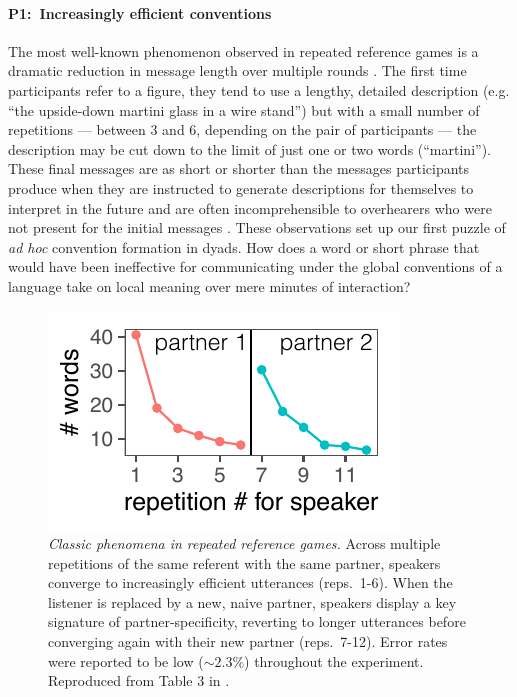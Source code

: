 \paragraph{P1:~Increasingly efficient conventions}
The most well-known phenomenon observed in repeated reference games is a dramatic reduction in message length over multiple rounds \cite{krauss_changes_1964, ClarkWilkesGibbs86_ReferringCollaborative, hawkins2020characterizing}. 
The first time participants refer to a figure, they tend to use a lengthy, detailed description (e.g. ``the upside-down martini glass in a wire stand'') but with a small number of repetitions --- between 3 and 6, depending on the pair of participants --- the description may be cut down to the limit of just one or two words (``martini''). 
These final messages are as short or shorter than the messages participants produce when they are instructed to generate descriptions for themselves to interpret in the future \cite{FussellKrauss89_IntendedAudienceCommonGround} and are often incomprehensible to overhearers who were not present for the initial messages \cite{SchoberClark89_Overhearers}.
These observations set up our first puzzle of \emph{ad hoc} convention formation in dyads.
How does a word or short phrase that would have been ineffective for communicating under the global conventions of a language take on local meaning over mere minutes of interaction? 

\begin{figure}[t!]
\centering
\includegraphics[scale=1.3]{./figures/clark92_compressed}
\vspace{1em}
\caption{\textit{Classic phenomena in repeated reference games.} Across multiple repetitions of the same referent with the same partner, speakers converge to increasingly efficient utterances (reps.~1-6). When the listener is  replaced by a new, naive partner, speakers display a key signature of partner-specificity, reverting to longer utterances before converging again with their new partner (reps.~7-12). Error rates were reported to be low ($\sim 2.3\%$) throughout the experiment. Reproduced from Table 3 in \protect{}.}
\label{fig:clark92}
\end{figure}

